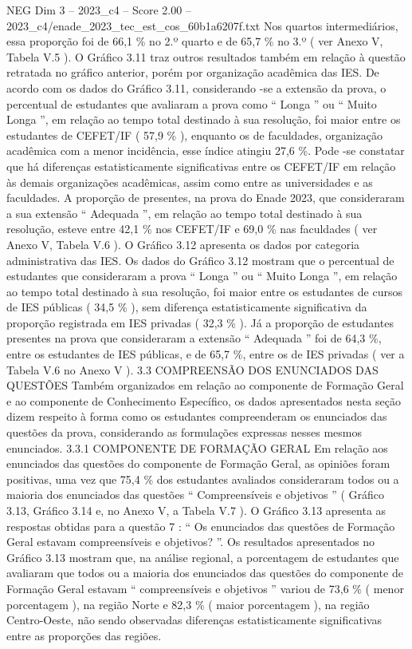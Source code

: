 \begin{textsample}{NEG Dim 3 – 2023\_c4 – Score 2.00 – 2023\_c4/enade\_2023\_tec\_est\_cos\_60b1a6207f.txt}
Nos quartos intermediários, essa proporção foi de 66,1 \% no 2.º quarto e de 65,7 \% no 3.º ( ver Anexo V, Tabela V.5 ).
O Gráfico 3.11 traz outros resultados também em relação à questão retratada no gráfico anterior, porém por organização acadêmica das IES.
De acordo com os dados do Gráfico 3.11, considerando -se a extensão da prova, o percentual de estudantes que avaliaram a prova como “ Longa ” ou “ Muito Longa ”, em relação ao tempo total destinado à sua resolução, foi maior entre os estudantes de CEFET/IF ( 57,9 \% ), enquanto os de faculdades, organização acadêmica com a menor incidência, esse índice atingiu 27,6 \%.
Pode -se constatar que há diferenças estatisticamente significativas entre os CEFET/IF em relação às demais organizações acadêmicas, assim como entre as universidades e as faculdades.
A proporção de presentes, na prova do Enade 2023, que consideraram a sua extensão “ Adequada ”, em relação ao tempo total destinado à sua resolução, esteve entre 42,1 \% nos CEFET/IF e 69,0 \% nas faculdades ( ver Anexo V, Tabela V.6 ).
O Gráfico 3.12 apresenta os dados por categoria administrativa das IES.
Os dados do Gráfico 3.12 mostram que o percentual de estudantes que consideraram a prova “ Longa ” ou “ Muito Longa ”, em relação ao tempo total destinado à sua resolução, foi maior entre os estudantes de cursos de IES públicas ( 34,5 \% ), sem diferença estatisticamente significativa da proporção registrada em IES privadas ( 32,3 \% ).
Já a proporção de estudantes presentes na prova que consideraram a extensão “ Adequada ” foi de 64,3 \%, entre os estudantes de IES públicas, e de 65,7 \%, entre os de IES privadas ( ver a Tabela V.6 no Anexo V ). 3.3 COMPREENSÃO DOS ENUNCIADOS DAS QUESTÕES Também organizados em relação ao componente de Formação Geral e ao componente de Conhecimento Específico, os dados apresentados nesta seção dizem respeito à forma como os estudantes compreenderam os enunciados das questões da prova, considerando as formulações expressas nesses mesmos enunciados. 3.3.1 COMPONENTE DE FORMAÇÃO GERAL Em relação aos enunciados das questões do componente de Formação Geral, as opiniões foram positivas, uma vez que 75,4 \% dos estudantes avaliados consideraram todos ou a maioria dos enunciados das questões “ Compreensíveis e objetivos ” ( Gráfico 3.13, Gráfico 3.14 e, no Anexo V, a Tabela V.7 ).
O Gráfico 3.13 apresenta as respostas obtidas para a questão 7 : “ Os enunciados das questões de Formação Geral estavam compreensíveis e objetivos? ”.
Os resultados apresentados no Gráfico 3.13 mostram que, na análise regional, a porcentagem de estudantes que avaliaram que todos ou a maioria dos enunciados das questões do componente de Formação Geral estavam “ compreensíveis e objetivos ” variou de 73,6 \% ( menor porcentagem ), na região Norte e 82,3 \% ( maior porcentagem ), na região Centro-Oeste, não sendo observadas diferenças estatisticamente significativas entre as proporções das regiões.

\end{textsample}
